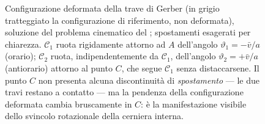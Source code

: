 \begin{figure}[htbp]
\begin{tikzpicture}
	\end{tikzpicture}
	\caption{Configurazione deformata della trave di Gerber (in grigio
		tratteggiato la configurazione di riferimento, non deformata),
		soluzione del problema cinematico del
		; spostamenti esagerati per
		chiarezza. $\mathcal{C}_1$ ruota rigidamente attorno ad $A$
		dell'angolo $\vartheta_1=-\bar v/a$ (orario); $\mathcal{C}_2$
		ruota, indipendentemente da $\mathcal{C}_1$, dell'angolo
		$\vartheta_2=+\bar v/a$ (antiorario) attorno al punto $C$, che
		segue $\mathcal{C}_1$ senza distaccarsene. Il punto $C$ non
		presenta alcuna discontinuità di \emph{spostamento} --- le due
		travi restano a contatto --- ma la pendenza della configurazione
		deformata cambia bruscamente in $C$: è la manifestazione
		visibile dello svincolo rotazionale della cerniera interna.}
	\label{fig:gerber_deformata}
\end{figure}
